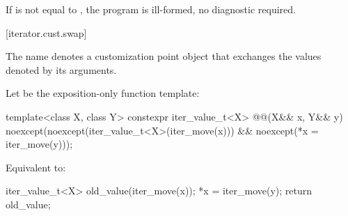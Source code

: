 \pnum
If  is not equal to ,
the program is ill-formed, no diagnostic required.

[iterator.cust.swap]{}

%
\pnum
The name  denotes
a customization point object
that exchanges the values denoted by its
arguments.

\pnum
Let  be the exposition-only function template:
\begin{itemdecl}
template<class X, class Y>
  constexpr iter_value_t<X> @@(X&& x, Y&& y)
    noexcept(noexcept(iter_value_t<X>(iter_move(x))) &&
             noexcept(*x = iter_move(y)));
\end{itemdecl}

\begin{itemdescr}
\pnum
\effects
Equivalent to:
\begin{codeblock}
iter_value_t<X> old_value(iter_move(x));
*x = iter_move(y);
return old_value;
\end{codeblock}
\end{itemdescr}

